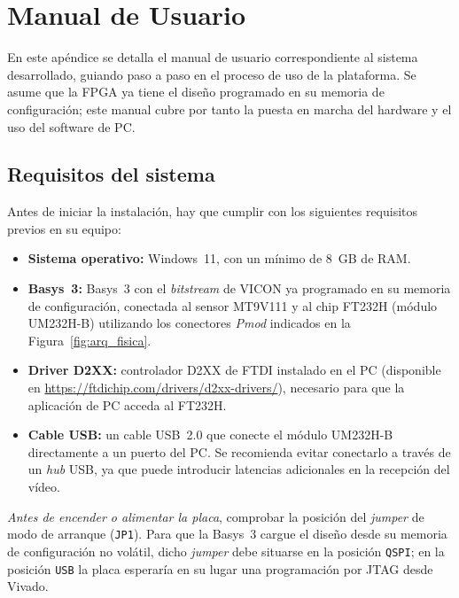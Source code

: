 \chapter{Manual de Usuario}
\label{ch:manual_usuario}

En este apéndice se detalla el manual de usuario correspondiente al sistema desarrollado, guiando paso a paso en el proceso de uso de la plataforma. Se asume que la \ac{FPGA} ya tiene el diseño programado en su memoria de configuración; este manual cubre por tanto la puesta en marcha del hardware y el uso del software de PC.

\section{Requisitos del sistema}
\label{sec:requisitos}

Antes de iniciar la instalación, hay que cumplir con los siguientes requisitos previos en su equipo:

\begin{itemize}
    \item \textbf{Sistema operativo:} Windows~11, con un mínimo de 8~GB de RAM.
    \item \textbf{Basys~3:} Basys~3 con el \textit{bitstream} de VICON ya programado en su memoria de configuración, conectada al sensor MT9V111 y al chip FT232H (módulo UM232H-B) utilizando los conectores \textit{Pmod} indicados en la Figura~\ref{fig:arq_fisica}.
    \item \textbf{Driver D2XX:} controlador D2XX de FTDI instalado en el PC (disponible en \url{https://ftdichip.com/drivers/d2xx-drivers/}), necesario para que la aplicación de PC acceda al FT232H.
    \item \textbf{Cable USB:} un cable USB~2.0 que conecte el módulo UM232H-B directamente a un puerto del PC. Se recomienda evitar conectarlo a través de un \textit{hub} USB, ya que puede introducir latencias adicionales en la recepción del vídeo.
\end{itemize}

\textit{Antes de encender o alimentar la placa}, comprobar la posición del \textit{jumper} de modo de arranque (\texttt{JP1}). Para que la Basys~3 cargue el diseño desde su memoria de configuración no volátil, dicho \textit{jumper} debe situarse en la posición \texttt{QSPI}; en la posición \texttt{USB} la placa esperaría en su lugar una programación por JTAG desde Vivado.

